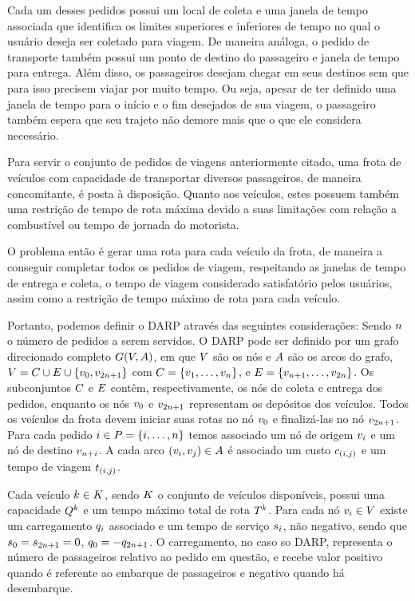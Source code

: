 Cada um desses pedidos possui um local de coleta e uma janela de
tempo associada que identifica os limites superiores e inferiores de tempo no 
qual o usuário deseja ser coletado para viagem.
De maneira análoga, o pedido de transporte também possui um ponto de destino do
passageiro e janela de tempo para entrega.
Além disso, os passageiros desejam chegar em seus destinos sem que para isso
precisem viajar por muito tempo.
Ou seja, apesar de ter definido uma janela de tempo para o início e o fim
desejados de sua viagem, o passageiro também espera que seu trajeto não demore
mais que o que ele considera necessário.

Para servir o conjunto de pedidos de viagens anteriormente citado, uma frota de
veículos com capacidade de transportar diversos passageiros, de maneira
concomitante, é posta à disposição.
Quanto aos veículos, estes possuem também uma restrição de tempo de rota máxima
devido a suas limitações com relação a combustível ou tempo de jornada do
motorista.

O problema então é gerar uma rota para cada veículo da frota, de maneira a
conseguir completar todos os pedidos de viagem, respeitando as janelas de tempo
de entrega e coleta, o tempo de viagem considerado satisfatório
pelos usuários, assim como a restrição de tempo máximo de rota para cada
veículo.

Portanto, podemos definir o DARP através das seguintes considerações:
Sendo $n$ o número de pedidos a serem servidos.
O DARP pode ser definido por um grafo direcionado completo 
$G(V,A)$, em que $V$ são os nós e $A$ são os arcos do
grafo, 
$V = C \cup E \cup \{v_{0}, v_{2n + 1} \}$ com
$C = \{v_{1}, \ldots, v_{n}\}$, e 
$E = \{v_{n + 1}, \ldots,
v_{2n}\}$.
Os subconjuntos $C$ e $E$ contêm, respectivamente, 
os nós de coleta e entrega dos pedidos, enquanto os nós $v_{0}$ e 
$v_{2n + 1}$ representam os depósitos dos veículos.
Todos os veículos da frota devem iniciar suas rotas no nó $v_{0}$ e
finalizá-las no nó $v_{2n + 1}$.
Para cada pedido $i \in P = \{i, \ldots,
n\}$ temos associado um nó de origem $v_{i}$ e um 
nó de destino $v_{n + i}$.
A cada arco $(v_{i},v_{j}) \in A$ é associado um custo 
$c_{(i,j)}$ e um tempo de viagem $t_{(i,j)}$.

Cada veículo $k \in K$, sendo $K$ o conjunto de 
veículos disponíveis, possui uma capacidade $Q^{k}$ e um tempo 
máximo total de rota $T^k$.
Para cada nó $v_{i} \in V$ existe um carregamento $q_{i}$ 
associado e um tempo de serviço $s_{i}$, não negativo, sendo que 
$s_{0} = s_{2n + 1} = 0$, 
$q_{0} = -q_{2n + 1}$.
O carregamento, no caso so DARP, representa o número de passageiros relativo ao
pedido em questão, e recebe valor positivo quando é referente ao embarque de
passageiros e negativo quando há desembarque.

